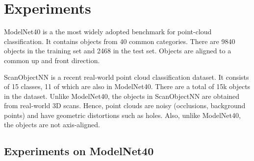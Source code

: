 \documentclass{article}
\newcommand\method{SimpleView}
\newcommand{\smallsec}[1]{\noindent {\bf #1:}}
\begin{document}
\section{Experiments}
\smallsec{ModelNet40} ModelNet40 is a the most widely adopted benchmark for point-cloud classification. It contains objects from 40 common categories. There are 9840 objects in the training set and 2468 in the test set. Objects are aligned to a common up and front direction. 

\smallsec{ScanObjectNN} ScanObjectNN is a recent real-world point cloud classification dataset. It consists of 15 classes, 11 of which are also in ModelNet40. There are a total of 15k objects in the dataset. Unlike ModelNet40, the objects in ScanObjectNN are obtained from real-world 3D scans. Hence, point clouds are noisy (occlusions, background points) and have geometric distortions such as holes. Also, unlike ModelNet40, the objects are not axis-aligned.

\subsection{Experiments on ModelNet40}
\begin{table*}[ht]
\caption{Ablation of various choices for \method{} on ModelNet40. The performance is evaluatated on the validation set.}
\label{tab:ablation}
\vspace{-3mm}
\end{table*}
\end{document}
